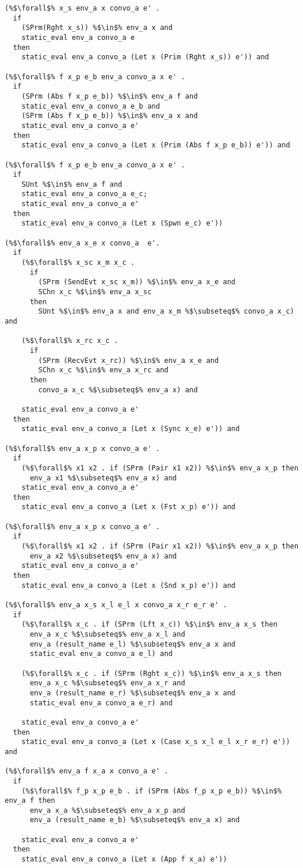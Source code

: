 \documentclass{article}
\begin{document}
\begin{lstlisting}[language=logic, escapechar=\%]
(%$\forall$% x_s env_a x convo_a e' .
  if
    (SPrm(Rght x_s)) %$\in$% env_a x and
    static_eval env_a convo_a e
  then
    static_eval env_a convo_a (Let x (Prim (Rght x_s)) e')) and

(%$\forall$% f x_p e_b env_a convo_a x e' .
  if
    (SPrm (Abs f x_p e_b)) %$\in$% env_a f and
    static_eval env_a convo_a e_b and
    (SPrm (Abs f x_p e_b)) %$\in$% env_a x and
    static_eval env_a convo_a e'
  then
    static_eval env_a convo_a (Let x (Prim (Abs f x_p e_b)) e')) and

(%$\forall$% f x_p e_b env_a convo_a x e' .
  if
    SUnt %$\in$% env_a f and
    static_eval env_a convo_a e_c;
    static_eval env_a convo_a e'
  then
    static_eval env_a convo_a (Let x (Spwn e_c) e'))

(%$\forall$% env_a x_e x convo_a  e'.
  if
    (%$\forall$% x_sc x_m x_c . 
      if
        (SPrm (SendEvt x_sc x_m)) %$\in$% env_a x_e and 
        SChn x_c %$\in$% env_a x_sc 
      then
        SUnt %$\in$% env_a x and env_a x_m %$\subseteq$% convo_a x_c) and

    (%$\forall$% x_rc x_c . 
      if
        (SPrm (RecvEvt x_rc)) %$\in$% env_a x_e and 
        SChn x_c %$\in$% env_a x_rc and 
      then
        convo_a x_c %$\subseteq$% env_a x) and

    static_eval env_a convo_a e'
  then
    static_eval env_a convo_a (Let x (Sync x_e) e')) and

(%$\forall$% env_a x_p x convo_a e' . 
  if
    (%$\forall$% x1 x2 . if (SPrm (Pair x1 x2)) %$\in$% env_a x_p then
      env_a x1 %$\subseteq$% env_a x) and
    static_eval env_a convo_a e'
  then
    static_eval env_a convo_a (Let x (Fst x_p) e')) and

(%$\forall$% env_a x_p x convo_a e' . 
  if
    (%$\forall$% x1 x2 . if (SPrm (Pair x1 x2)) %$\in$% env_a x_p then
      env_a x2 %$\subseteq$% env_a x) and
    static_eval env_a convo_a e'
  then
    static_eval env_a convo_a (Let x (Snd x_p) e')) and

(%$\forall$% env_a x_s x_l e_l x convo_a x_r e_r e' . 
  if
    (%$\forall$% x_c . if (SPrm (Lft x_c)) %$\in$% env_a x_s then 
      env_a x_c %$\subseteq$% env_a x_l and
      env_a (result_name e_l) %$\subseteq$% env_a x and
      static_eval env_a convo_a e_l) and

    (%$\forall$% x_c . if (SPrm (Rght x_c)) %$\in$% env_a x_s then 
      env_a x_c %$\subseteq$% env_a x_r and
      env_a (result_name e_r) %$\subseteq$% env_a x and
      static_eval env_a convo_a e_r) and

    static_eval env_a convo_a e'
  then
    static_eval env_a convo_a (Let x (Case x_s x_l e_l x_r e_r) e')) and

(%$\forall$% env_a f x_a x convo_a e' . 
  if
    (%$\forall$% f_p x_p e_b . if (SPrm (Abs f_p x_p e_b)) %$\in$% env_a f then 
      env_a x_a %$\subseteq$% env_a x_p and 
      env_a (result_name e_b) %$\subseteq$% env_a x) and

    static_eval env_a convo_a e'
  then
    static_eval env_a convo_a (Let x (App f x_a) e'))

\end{lstlisting}
\end{document}
